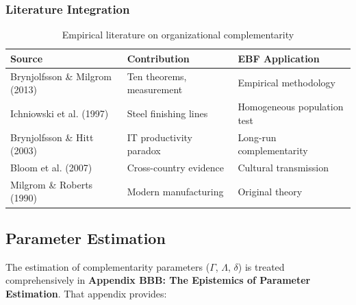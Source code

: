 \subsubsection{Literature Integration}

\begin{table}[h]
\centering
\small
\begin{tabular}{p{3.5cm}p{4cm}p{5cm}}
\toprule
\textbf{Source} & \textbf{Contribution} & \textbf{EBF Application} \\
\midrule
Brynjolfsson \& Milgrom (2013) & Ten theorems, measurement & Empirical methodology \\
Ichniowski et al. (1997) & Steel finishing lines & Homogeneous population test \\
Brynjolfsson \& Hitt (2003) & IT productivity paradox & Long-run complementarity \\
Bloom et al. (2007) & Cross-country evidence & Cultural transmission \\
Milgrom \& Roberts (1990) & Modern manufacturing & Original theory \\
\bottomrule
\end{tabular}
\caption{Empirical literature on organizational complementarity}
\label{tab:empirical-lit}
\end{table}







\subsection{Parameter Estimation}
\label{sec:B-estimation-ref}

The estimation of complementarity parameters ($\Gamma$, $\Lambda$, $\delta$) is 
treated comprehensively in \textbf{Appendix BBB: The Epistemics of Parameter 
Estimation}. That appendix provides:

